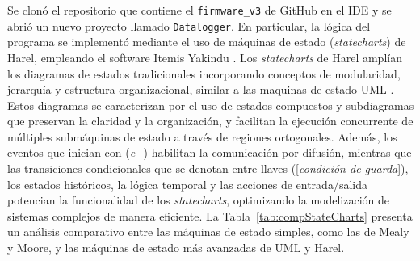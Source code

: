 Se clonó el repositorio que contiene el \texttt{firmware\_v3} de GitHub en el IDE y se abrió un nuevo proyecto llamado \texttt{Datalogger}. En particular, la lógica del programa se implementó mediante el uso de máquinas de estado (\textit{statecharts}) de Harel, empleando el software Itemis Yakindu \cite{itemis_create}. Los \textit{statecharts} de Harel amplían los diagramas de estados tradicionales incorporando conceptos de modularidad, jerarquía y estructura organizacional, similar a las maquinas de estado UML \cite{uml_state_machine}. Estos diagramas se caracterizan por el uso de estados compuestos y subdiagramas que preservan la claridad y la organización, y facilitan la ejecución concurrente de múltiples submáquinas de estado a través de regiones ortogonales. Además, los eventos que inician con (\textit{e\_}) habilitan la comunicación por difusión, mientras que las transiciones condicionales que se denotan entre llaves ([\textit{condición de guarda}]), los estados históricos, la lógica temporal y las acciones de entrada/salida potencian la funcionalidad de los \textit{statecharts}, optimizando la modelización de sistemas complejos de manera eficiente. La Tabla~\ref{tab:compStateCharts} presenta un análisis comparativo entre las máquinas de estado simples, como las de Mealy y Moore, y las máquinas de estado más avanzadas de UML y Harel.





